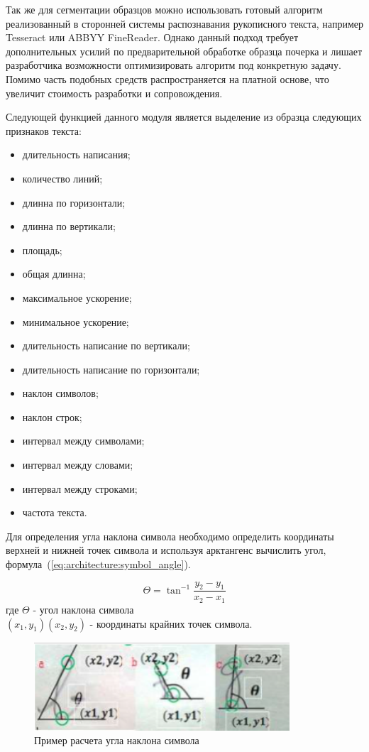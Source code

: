 Так же для сегментации образцов можно использовать готовый алгоритм реализованный в сторонней системы распознавания рукописного текста, например Tesseract или ABBYY FineReader. Однако данный подход требует дополнительных усилий по предварительной обработке образца почерка и лишает разработчика возможности оптимизировать алгоритм под конкретную задачу. Помимо часть подобных средств распространяется на платной основе, что увеличит стоимость разработки и сопровождения.

Следующей функцией данного модуля является выделение из образца следующих признаков текста:
\begin{itemize}
  \item длительность написания;  
  \item количество линий;
  \item длинна по горизонтали;
  \item длинна по вертикали;
  \item площадь;
  \item общая длинна;
  \item максимальное ускорение;
  \item минимальное ускорение;
  \item длительность написание по вертикали;
  \item длительность написание по горизонтали;
  \item наклон символов;
  \item наклон строк;
  \item интервал между символами;
  \item интервал между словами;
  \item интервал между строками;
  \item частота текста.
\end{itemize}

Для определения угла наклона символа необходимо определить координаты верхней и нижней точек символа и используя арктангенс вычислить угол, формула~(\ref{eq:architecture:symbol_angle}).

\begin{equation}
  \label{eq:architecture:symbol_angle}
  \Theta = \tan^{-1}{\frac{y_2 - y_1}{x_2 - x_1}}
\end{equation}
где  $\Theta$ - угол наклона символа \\
     $ (x_1, y_1) (x_2, y_2) $  - координаты крайних точек символа.

\begin{figure}[ht]
    \centering
    \includegraphics[width=0.85\textwidth]{figures/char_angle.png}
    \caption{Пример расчета угла наклона символа}
    \label{fig:architecture:symbol_angle}
\end{figure}

